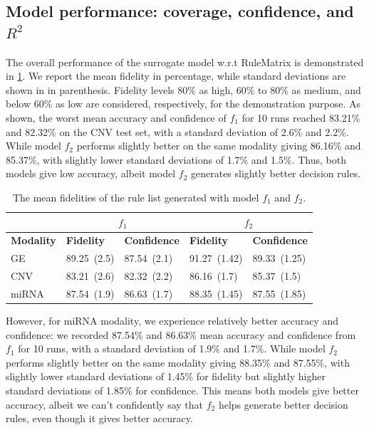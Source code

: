 \subsection{Model performance: coverage, confidence, and $R^2$}
The overall performance of the surrogate model w.r.t RuleMatrix is demonstrated in \cref{table:rules_overall_result}. We report the mean fidelity in percentage, while standard deviations are shown in in parenthesis. Fidelity levels 80\% as high, 60\% to 80\% as medium, and below 60\% as low are considered, respectively, for the demonstration purpose. As shown, the worst mean accuracy and confidence of $f_1$ for 10 runs reached 83.21\% and 82.32\% on the CNV test set, with a standard deviation of 2.6\% and 2.2\%. While model $f_2$ performs slightly better on the same modality giving 86.16\% and 85.37\%, with slightly lower standard deviations of 1.7\% and 1.5\%. Thus, both models give low accuracy, albeit model $f_2$ generates slightly better decision rules. 

\begin{table}[h!]
    \centering
    \caption{The mean fidelities of the rule list generated with model $f_1$ and $f_2$.}
    \label{table:rules_overall_result}
    \vspace{-2mm}
    \scriptsize{
    \begin{tabular}{l|l|l|l|l} 
        \hline
         & \multicolumn{2}{c|}{$f_1$} & \multicolumn{2}{c}{$f_2$} \\ 
        \hline
        \textbf{Modality} & \textbf{Fidelity} & \textbf{Confidence} & \textbf{Fidelity} & \textbf{Confidence} \\ 
        \hline
        GE  & 89.25~(2.5) & 87.54~(2.1) & 91.27~(1.42) & 89.33~(1.25) \\ 
        \cline{1-3}\cline{4-5}
        CNV & 83.21~(2.6) & 82.32~(2.2) & 86.16~(1.7) & 85.37~(1.5) \\ 
        \hline
        miRNA & 87.54~(1.9) & 86.63~(1.7) & 88.35~(1.45) & 87.55~(1.85) \\
        \hline
    \end{tabular}}
    \vspace{-4mm}
\end{table}

However, for miRNA modality, we experience relatively better accuracy and confidence: we recorded 87.54\% and 86.63\% mean accuracy and confidence from $f_1$ for 10 runs, with a standard deviation of 1.9\% and 1.7\%. While model $f_2$ performs slightly better on the same modality giving 88.35\% and 87.55\%, with slightly lower standard deviations of 1.45\% for fidelity but slightly higher standard deviations of 1.85\% for confidence. This means both models give better accuracy, albeit we can't confidently say that $f_2$ helps generate better decision rules, even though it gives better accuracy. 

